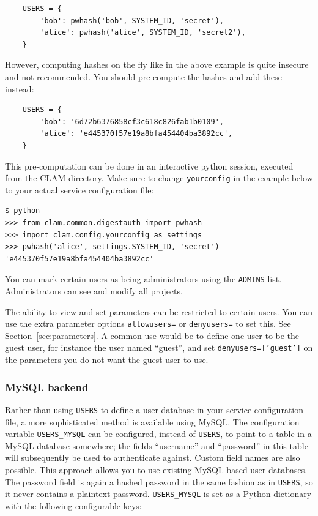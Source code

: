 \documentclass[a4paper,12pt,twoside,openright]{report}
\begin{document}
{ \small
\begin{verbatim}
    USERS = {
        'bob': pwhash('bob', SYSTEM_ID, 'secret'), 
        'alice': pwhash('alice', SYSTEM_ID, 'secret2'),
    }
\end{verbatim}
}

However, computing hashes on the fly like in the above example is quite
insecure and not recommended. You should pre-compute the hashes and add these
instead:

{ \small
\begin{verbatim}
    USERS = {
        'bob': '6d72b6376858cf3c618c826fab1b0109',
        'alice': 'e445370f57e19a8bfa454404ba3892cc',
    }
\end{verbatim}
}

This pre-computation can be done in an interactive python session, executed from
the CLAM directory. Make sure to change \texttt{yourconfig} in the
example below to your actual service configuration file:

{ \small
\begin{verbatim}
$ python
>>> from clam.common.digestauth import pwhash
>>> import clam.config.yourconfig as settings
>>> pwhash('alice', settings.SYSTEM_ID, 'secret')
'e445370f57e19a8bfa454404ba3892cc'
\end{verbatim}
}

You can mark certain users as being administrators using the \texttt{ADMINS}
list. Administrators can see and modify all projects.


The ability to view and set parameters can be restricted to certain users. You
can use the extra parameter options \texttt{allowusers=} or \texttt{denyusers=}
to set this. See Section~\ref{sec:parameters}. A common use would be to define
one user to be the guest user, for instance the user named ``guest'', and set
\texttt{denyusers=['guest']} on the parameters you do not want the guest user
to use.

\subsubsection{MySQL backend}

Rather than using \texttt{USERS} to define a user database in your service
configuration file, a more sophisticated method is available using MySQL. The
configuration variable \texttt{USERS\_MYSQL} can be configured, instead of
\texttt{USERS}, to point to a table in a MySQL database somewhere; the fields
``username'' and ``password'' in this table will subsequently be used to
authenticate against. Custom field names are also possible. This approach
allows you to use existing MySQL-based user databases. The password field is
again a hashed password in the same fashion as in \texttt{USERS}, so it never
contains a plaintext password. \texttt{USERS\_MYSQL} is set as a Python
dictionary with the following configurable keys:
\end{document}
